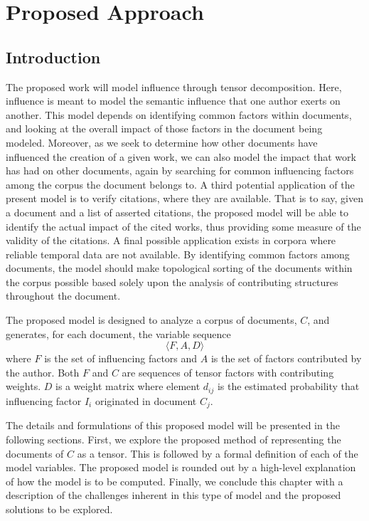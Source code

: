 \documentclass{report}
\begin{document}
\chapter{Proposed Approach}

\section{Introduction}
The proposed work will model influence through tensor decomposition.
Here, influence is meant to model the semantic influence that one author
exerts on another.  This model depends on identifying common factors 
within documents, and looking at the overall impact of those factors in 
the document being modeled. 
Moreover, as we seek to determine how other documents have influenced 
the creation of a given work, we can also model the impact that work
has had on other documents, again by searching for common influencing
factors among the corpus the document belongs to.  
A third potential application of the present model is to verify citations,
where they are available.  That is to say, given a document and a list of
asserted citations, the proposed model will be able to identify the
actual impact of the cited works, thus providing some measure of 
the validity of the citations.  
A final possible application exists in corpora where reliable temporal
data are not available.  By identifying common factors among documents,
the model should make topological sorting of the documents within the
corpus possible based solely upon the analysis of contributing structures
throughout the document.

The proposed model is designed to analyze a corpus of documents, $C$, and 
generates, for each document, the variable sequence
\[
\langle F, A, D \rangle
\]
where $F$ is the set of influencing factors and $A$ is the set of factors contributed by the author.  Both $F$ and $C$ are sequences of 
tensor factors with contributing weights.  $D$ is a weight matrix
where element $d_{ij}$ is the estimated probability that influencing 
factor $I_i$ originated in document $C_j$.

The details and formulations of this proposed model will be presented
in the following sections.  First, we explore the proposed method
of representing the documents of $C$ as a tensor.  This is followed by
a formal definition of each of the model variables.  The proposed model
is rounded out by a high-level explanation of how the model is to be
computed.  Finally, we conclude this chapter with a description of
the challenges inherent in this type of model and the proposed solutions
to be explored.
\end{document}
